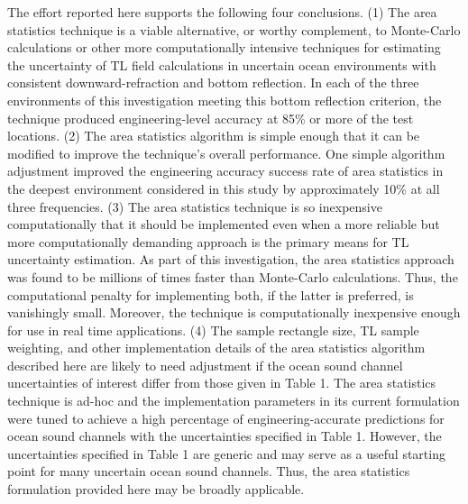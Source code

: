 The effort reported here supports the following four conclusions. (1)
The area statistics technique is a viable alternative, or worthy
complement, to Monte-Carlo calculations or other more computationally
intensive techniques for estimating the uncertainty of TL field
calculations in uncertain ocean environments with consistent
downward-refraction and bottom reflection. In each of the three
environments of this investigation meeting this bottom reflection
criterion, the technique produced engineering-level accuracy at 85\%
or more of the test locations. (2) The area statistics algorithm is
simple enough that it can be modified to improve the technique's
overall performance. One simple algorithm adjustment improved the
engineering accuracy success rate of area statistics in the deepest
environment considered in this study by approximately 10\% at all
three frequencies. (3) The area statistics technique is so inexpensive
computationally that it should be implemented even when a more
reliable but more computationally demanding approach is the primary
means for TL uncertainty estimation. As part of this investigation,
the area statistics approach was found to be millions of times faster
than Monte-Carlo calculations. Thus, the computational penalty for
implementing both, if the latter is preferred, is vanishingly
small. Moreover, the technique is computationally inexpensive enough
for use in real time applications. (4) The sample rectangle size, TL
sample weighting, and other implementation details of the area
statistics algorithm described here are likely to need adjustment if
the ocean sound channel uncertainties of interest differ from those
given in Table 1. The area statistics technique is ad-hoc and the
implementation parameters in its current formulation were tuned to
achieve a high percentage of engineering-accurate predictions for
ocean sound channels with the uncertainties specified in Table
1. However, the uncertainties specified in Table 1 are generic and may
serve as a useful starting point for many uncertain ocean sound
channels. Thus, the area statistics formulation provided here may be
broadly applicable.

